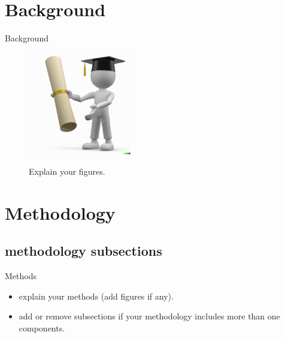 \documentclass[xcolor=table]{beamer}
\begin{document}
\section{Background}
\begin{frame}{Background}
    \begin{minipage}[c]{1\linewidth}
        \begin{figure}[H]
         \centering
         \includegraphics[width = 0.4\textwidth]{figs/fig.png}
         \label{fig:fig}
         \caption{Explain your figures.}
        \end{figure}
    \end{minipage}
\end{frame}
\section{Methodology}
\subsection{methodology subsections}
\begin{frame}{Methods}
    \begin{itemize}
        \item explain your methods (add figures if any).
        \item add or remove subsections if your methodology includes more than one components.
    \end{itemize}
\end{frame}
\end{document}
